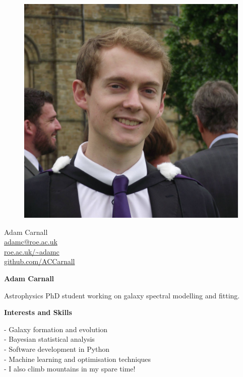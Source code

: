 \documentclass[a4paper,11pt,final]{memoir}
\newcommand{\Sep}{\vspace{1.5em}}
\newcommand{\SmallSep}{\vspace{0.5em}}
\newcommand{\CVSection}[1]
	{\Large\textbf{#1}\par
	\SmallSep\normalsize\normalfont}
\begin{document}
\begin{figure}
	\hfill
	\includegraphics[width=\columnwidth]{graduation.jpg}
	\vspace{-8cm}
\end{figure}

\begin{flushright}\small
	Adam Carnall \\
	\SmallSep
	\url{adamc@roe.ac.uk}  \\
	\SmallSep
	\url{roe.ac.uk/~adamc} \\
	\SmallSep
	\url{github.com/ACCarnall} \\
\end{flushright}\normalsize
\framebreak


\Huge\bfseries {\color{RoyalBlue} Adam Carnall} \\
\normalsize\normalfont

Astrophysics PhD student working on galaxy spectral modelling and fitting.

\Sep

\CVSection{Interests and Skills}

 - Galaxy formation and evolution\\
 - Bayesian statistical analysis\\
 - Software development in Python\\
 - Machine learning and optimisation techniques\\
 - I also climb mountains in my spare time!
\end{document}
